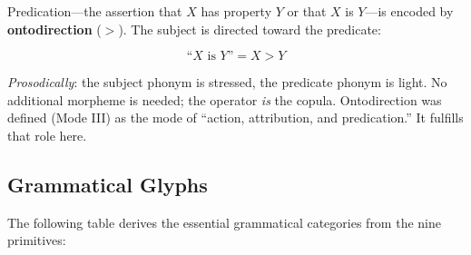 \documentclass[12pt, letterpaper]{book}
\def\equiv{=}%
\def\triangleright{>}%
\begin{document}
Predication---the assertion that $X$ has property $Y$ or that $X$ is $Y$---is encoded by \textbf{ontodirection} ($\triangleright$). The subject is directed toward the predicate:

\[
\text{``}X \text{ is } Y\text{''} \equiv X \triangleright Y
\]

\noindent\textit{Prosodically}: the subject phonym is stressed, the predicate phonym is light. No additional morpheme is needed; the operator \textit{is} the copula. Ontodirection was defined (Mode III) as the mode of ``action, attribution, and predication.'' It fulfills that role here.

\subsection{Grammatical Glyphs}

The following table derives the essential grammatical categories from the nine primitives:
\end{document}
